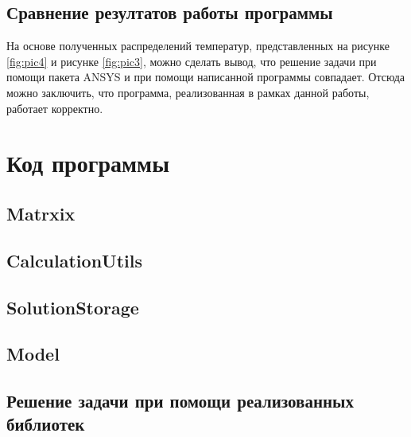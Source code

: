 \documentclass[12pt, a4paper]{article}
\begin{document}
    \subsection{Сравнение резултатов работы программы}
    На основе полученных распределений температур, представленных на рисунке \ref{fig:pic4} и рисунке \ref{fig:pic3}, можно сделать вывод, что решение задачи при помощи пакета ANSYS и при помощи написанной программы совпадает. Отсюда можно заключить, что программа, реализованная в рамках данной работы, работает корректно.
	
	\section{Код программы}
	
	\subsection{Matrxix}
	
	
	\subsection{CalculationUtils}
	
	
	\subsection{SolutionStorage}
	
	
	\subsection{Model}
	
	
	
	\subsection{Решение задачи при помощи реализованных библиотек}
	
	
	
\end{document}
